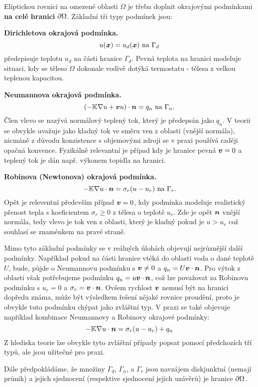 Eliptickou rovnici na omezené oblasti $\Omega$ je třeba doplnit okrajovými podmínkami 
{\bf na celé hranici} $\partial \Omega$. Základní tři typy podmínek jsou:

{\bf Dirichletova okrajová podmínka.} 
\[
    u(\mathbf{\boldsymbol{x}}) = u_d(\mathbf{\boldsymbol{x}})\text{ na }\Gamma_d
\]
předepisuje teplotu $u_d$ na části hranice $\Gamma_d$. Pevná teplota na hranici modeluje situaci, kdy se těleso $\Omega$ dokonale vodivě dotýká termostatu - 
tělesa z velkou teplenou kapacitou.

{\bf Neumannova okrajová podmínka.}
\[
    (-{\mathbb{K}} \nabla u + \mathbf{\boldsymbol{v}} u) \cdot \mathbf{\boldsymbol{n}} = q_n\text{ na }\Gamma_n.
\]
Člen vlevo se nazývá normálový teplený tok, který je předepsán jako $q_n$. V teorii se obvykle uvažuje jako kladný tok ve směru ven z oblasti (vnější normála), 
nicmáně z důvodu konzistence s objemovými zdroji se v praxi používá raději opačná konvence. Fyzikálně relevantní je případ kdy je hranice pevná 
$\mathbf{\boldsymbol{v}} = 0$ a teplený tok je dán např. výkonem topidla na hranici. 

{\bf Robinova (Newtonova) okrajová podmínka.}
\[
     -{\mathbb{K}} \nabla u  \cdot \mathbf{\boldsymbol{n}} = \sigma_r(u - u_r)\text{ na }\Gamma_r. 
\]
Opět je releventní především případ $\mathbf{\boldsymbol{v}} =0$, kdy podmínka modeluje realistický přenost tepla s koeficientem $\sigma_r\ge 0$ z tělesa o teplotě $u_r$.
Zde je opět $\mathbf{\boldsymbol{n}}$ vnější normála, tedy vlevo je tok ven z oblasti, který je kladný pokud je $u > u_r$ což souhlasí se znaménkem na pravé straně.

Mimo tyto základní podmínky se v reálných úlohách objevují nejrůznější další podmínky. Například pokud na části hranice vtéká do oblasti 
voda o dané teplotě $U$, bude, půjde o Neumannovu podmínku s $\mathbf{\boldsymbol{v}}\ne 0$ a 
$q_n=U\mathbf{\boldsymbol{v}} \cdot \mathbf{\boldsymbol{n}}$. Pro výtok z oblasti však potřebujeme podmínku $q_n=u\mathbf{\boldsymbol{v}} \cdot \mathbf{\boldsymbol{n}}$, což lze považovat za Robinovu podmínku s $u_r=0$ 
a $\sigma_r=\mathbf{\boldsymbol{v}} \cdot\mathbf{\boldsymbol{n}}$. Ovšem rychlost $\mathbf{\boldsymbol{v}}$ nemusí být na hranici dopředu známa, může být výsledkem řešení nějaké rovnice proudění, proto 
je obvykle tuto podmínku chýpat jako zvláštní typ.
V praxi se také objevuje například kombinace Neumannovy a Robinovy okrajové podmínky:
\[
    -{\mathbb{K}} \nabla u \cdot \mathbf{\boldsymbol{n}} = \sigma_r(u - u_r) + q_n
\]
Z hlediska teorie lze obvykle tyto zvláštní případy popsat pomocí předchozích tří typů, ale jsou užitečné pro praxi.

Dále předpokládáme, že množiny $\Gamma_d$, $\Gamma_n$, a $\Gamma_r$ jsou navzájem diskjunktní (nemají průnik) a jejich sjednocení (respektive sjednocení jejich uzávěrů)
je hranice $\partial \Omega$.



